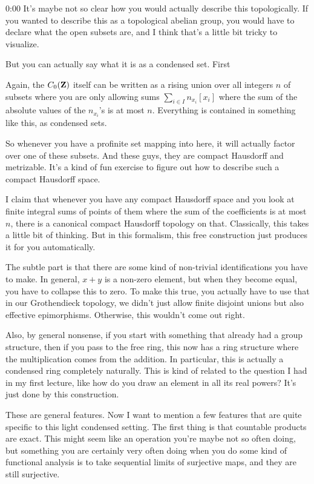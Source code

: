 \begin{unfinished}{0:00}
It's maybe not so clear how you would actually describe this topologically. If you wanted to describe this as a topological abelian group, you would have to declare what the open subsets are, and I think that's a little bit tricky to visualize.

But you can actually say what it is as a condensed set. First

Again, the $C_0(\mathbf Z)$ itself can be written as a rising union over all integers $n$ of subsets where you are only allowing sums $\sum_{i\in I} n_{x_i}[x_i]$ where the sum of the absolute values of the $n_{x_i}$'s is at most $n$. Everything is contained in something like this, as condensed sets.

So whenever you have a profinite set mapping into here, it will actually factor over one of these subsets. And these guys, they are compact Hausdorff and metrizable. It's a kind of fun exercise to figure out how to describe such a compact Hausdorff space.

I claim that whenever you have any compact Hausdorff space and you look at finite integral sums of points of them where the sum of the coefficients is at most $n$, there is a canonical compact Hausdorff topology on that. Classically, this takes a little bit of thinking. But in this formalism, this free construction just produces it for you automatically.

The subtle part is that there are some kind of non-trivial identifications you have to make. In general, $x+y$ is a non-zero element, but when they become equal, you have to collapse this to zero. To make this true, you actually have to use that in our Grothendieck topology, we didn't just allow finite disjoint unions but also effective epimorphisms. Otherwise, this wouldn't come out right.

Also, by general nonsense, if you start with something that already had a group structure, then if you pass to the free ring, this now has a ring structure where the multiplication comes from the addition. In particular, this is actually a condensed ring completely naturally. This is kind of related to the question I had in my first lecture, like how do you draw an element in all its real powers? It's just done by this construction.

These are general features. Now I want to mention a few features that are quite specific to this light condensed setting. The first thing is that countable products are exact. This might seem like an operation you're maybe not so often doing, but something you are certainly very often doing when you do some kind of functional analysis is to take sequential limits of surjective maps, and they are still surjective.


\end{unfinished}
